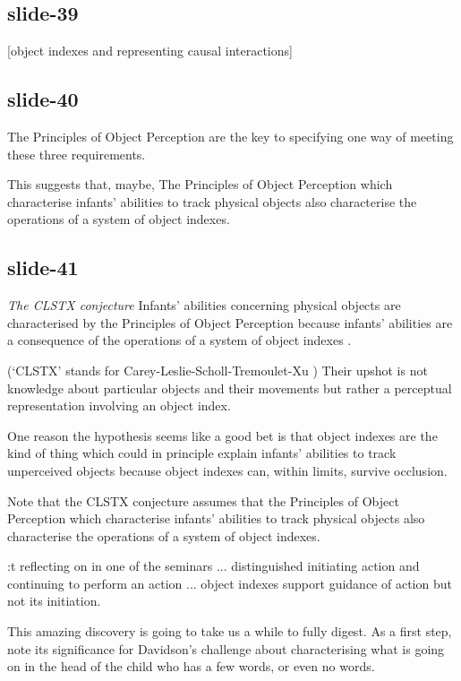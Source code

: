 \documentclass[12pt,\papersize]{extarticle}
\begin{document}
\subsection{slide-39}
[object indexes and representing causal interactions]

\subsection{slide-40}
The Principles of Object Perception are the key to specifying one way
of meeting these three requirements.

This suggests that, maybe,
The Principles of Object Perception which characterise infants’ abilities to track
physical objects also characterise the operations of a system of object indexes.
\subsection{slide-41}
\emph{The CLSTX conjecture}
Infants’ abilities concerning physical objects are
characterised by the Principles of Object Perception because infants’ abilities
are a consequence of the operations of a system of object indexes
\citep{Leslie:1998zk,Scholl:1999mi,Carey:2001ue,scholl:2007_objecta}.

(‘CLSTX’ stands for Carey-Leslie-Scholl-Tremoulet-Xu \citep[see][]{Leslie:1998zk,Scholl:1999mi,Carey:2001ue,scholl:2007_objecta})
Their upshot is not knowledge about particular objects and their movements but rather a
perceptual representation involving an object index.

One reason the hypothesis seems like a good bet is that object
indexes are the kind of thing which could in principle explain
infants’ abilities to track unperceived objects because object indexes
can, within limits, survive occlusion.

Note that the CLSTX conjecture assumes that
the Principles of Object Perception which characterise infants’ abilities to track
physical objects also characterise the operations of a system of object indexes.

:t
            reflecting on \citet{mccurry:2009_beyond} in one of the seminars ... distinguished
            initiating action and continuing to perform an action ... object indexes support
            guidance of action but not its initiation.

This amazing discovery is going to take us a while to fully digest.  As a first step, note its
significance for Davidson's challenge about characterising what is going on in the head of the
child who has a few words, or even no words.
\end{document}
